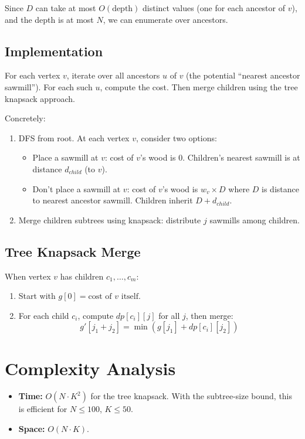 \documentclass[11pt,a4paper]{article}
\begin{document}
Since $D$ can take at most $O(\text{depth})$ distinct values (one for each ancestor of $v$), and the depth is at most $N$, we can enumerate over ancestors.

\subsection{Implementation}
For each vertex $v$, iterate over all ancestors $u$ of $v$ (the potential ``nearest ancestor sawmill''). For each such $u$, compute the cost. Then merge children using the tree knapsack approach.

Concretely:
\begin{enumerate}
    \item DFS from root. At each vertex $v$, consider two options:
    \begin{itemize}
        \item Place a sawmill at $v$: cost of $v$'s wood is 0. Children's nearest sawmill is at distance $d_{child}$ (to $v$).
        \item Don't place a sawmill at $v$: cost of $v$'s wood is $w_v \times D$ where $D$ is distance to nearest ancestor sawmill. Children inherit $D + d_{child}$.
    \end{itemize}
    \item Merge children subtrees using knapsack: distribute $j$ sawmills among children.
\end{enumerate}

\subsection{Tree Knapsack Merge}
When vertex $v$ has children $c_1, \ldots, c_m$:
\begin{enumerate}
    \item Start with $g[0] = \text{cost of } v \text{ itself}$.
    \item For each child $c_i$, compute $dp[c_i][j]$ for all $j$, then merge:
    \[
    g'[j_1 + j_2] = \min(g[j_1] + dp[c_i][j_2])
    \]
\end{enumerate}

\section{Complexity Analysis}
\begin{itemize}
    \item \textbf{Time:} $O(N \cdot K^2)$ for the tree knapsack. With the subtree-size bound, this is efficient for $N \leq 100$, $K \leq 50$.
    \item \textbf{Space:} $O(N \cdot K)$.
\end{itemize}
\end{document}
